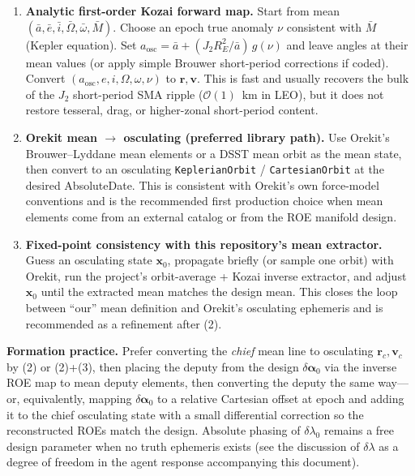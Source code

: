 \documentclass[11pt]{article}
\begin{document}
\begin{enumerate}[label=\textbf{\arabic*.}]
    \item \textbf{Analytic first-order Kozai forward map.}
    Start from mean $(\bar{a},\bar{e},\bar{i},\bar{\Omega},\bar{\omega},\bar{M})$. Choose an epoch true anomaly $\nu$ consistent with $\bar{M}$ (Kepler equation). Set
    $a_\mathrm{osc} = \bar{a} + (J_2 R_E^2/\bar{a})\,g(\nu)$ and leave angles at their mean values (or apply simple Brouwer short-period corrections if coded). Convert $(a_\mathrm{osc},e,i,\Omega,\omega,\nu)$ to $\mathbf{r},\mathbf{v}$. This is fast and usually recovers the bulk of the $J_2$ short-period SMA ripple ($\mathcal{O}(1)$~km in LEO), but it does not restore tesseral, drag, or higher-zonal short-period content.

    \item \textbf{Orekit mean $\to$ osculating (preferred library path).}
    Use Orekit's Brouwer--Lyddane mean elements or a DSST mean orbit as the mean state, then convert to an osculating \texttt{KeplerianOrbit} / \texttt{CartesianOrbit} at the desired AbsoluteDate. This is consistent with Orekit's own force-model conventions and is the recommended first production choice when mean elements come from an external catalog or from the ROE manifold design.

    \item \textbf{Fixed-point consistency with this repository's mean extractor.}
    Guess an osculating state $\mathbf{x}_0$, propagate briefly (or sample one orbit) with Orekit, run the project's orbit-average + Kozai inverse extractor, and adjust $\mathbf{x}_0$ until the extracted mean matches the design mean. This closes the loop between ``our'' mean definition and Orekit's osculating ephemeris and is recommended as a refinement after (2).
\end{enumerate}

\textbf{Formation practice.} Prefer converting the \emph{chief} mean line to osculating $\mathbf{r}_c,\mathbf{v}_c$ by (2) or (2)+(3), then placing the deputy from the design $\delta\bm{\alpha}_0$ via the inverse ROE map to mean deputy elements, then converting the deputy the same way---or, equivalently, mapping $\delta\bm{\alpha}_0$ to a relative Cartesian offset at epoch and adding it to the chief osculating state with a small differential correction so the reconstructed ROEs match the design. Absolute phasing of $\delta\lambda_0$ remains a free design parameter when no truth ephemeris exists (see the discussion of $\delta\lambda$ as a degree of freedom in the agent response accompanying this document).
\end{document}
